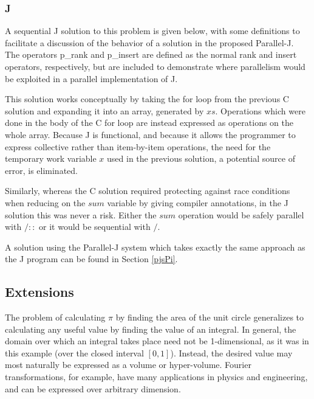 \subsubsection{J}
A sequential J solution to this problem is given below, 
with some definitions to facilitate a discussion 
of the behavior of a solution in the proposed Parallel-J. 
The operators \ttfamily p\_rank \normalfont and \ttfamily p\_insert \normalfont 
are defined as the normal rank and insert operators, respectively,  
but are included to demonstrate where parallelism would be exploited in a parallel implementation of J.

\begin{singlespacing}
\begin{small}

\end{small}
\end{singlespacing}

This solution works conceptually by taking the for loop from the previous C solution 
and expanding it into an array, generated by $xs$.
Operations which were done in the body of the C for loop 
are instead expressed as operations on the whole array. 
Because J is functional, and 
because it allows the programmer to express collective rather than item-by-item operations, 
the need for the temporary work variable $x$ used in the previous solution, 
a potential source of error, is eliminated. 

Similarly, whereas the C solution required 
protecting against race conditions when reducing on the $sum$ variable
by giving compiler annotations, 
in the J solution this was never a risk.
Either the $sum$ operation would be safely parallel with $/::$ or 
it would be sequential with $/$.

A solution using the Parallel-J system which takes exactly the same approach as the J program 
can be found in Section \ref{pjsPi}.

\subsection{Extensions}
\label{piext}
The problem of calculating $\pi$ by finding the area of the unit circle 
generalizes to calculating any useful value by finding the value of an integral. 
In general, the domain over which an integral takes place need not be 1-dimensional, 
as it was in this example (over the closed interval $[0,1]$).
Instead, the desired value may most naturally be expressed as a volume or hyper-volume. 
Fourier transformations, for example, have many applications in physics and engineering, 
and can be expressed over arbitrary dimension.

